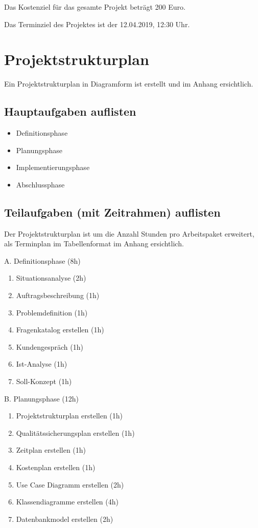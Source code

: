 \documentclass[11pt, a4paper]{article}
\begin{document}
Das Kostenziel für das gesamte Projekt beträgt 200 Euro.

Das Terminziel des Projektes ist der 12.04.2019, 12:30 Uhr.

\section{Projektstrukturplan}
Ein Projektstrukturplan in Diagramform ist erstellt und im Anhang ersichtlich.

\subsection{Hauptaufgaben auflisten}
\begin{itemize}
  \item Definitionsphase
  \item Planungsphase
  \item Implementierungsphase
  \item Abschlussphase
\end{itemize}

\subsection{Teilaufgaben (mit Zeitrahmen) auflisten}
Der Projektstrukturplan ist um die Anzahl Stunden pro Arbeitspaket erweitert,
als Terminplan im Tabellenformat im Anhang ersichtlich.

A. Definitionsphase (8h)
\begin{enumerate}
  \item Situationsanalyse (2h)
  \item Auftragsbeschreibung (1h)
  \item Problemdefinition (1h)
  \item Fragenkatalog erstellen (1h)
  \item Kundengespräch (1h)
  \item Ist-Analyse (1h)
  \item Soll-Konzept (1h)
\end{enumerate}

B. Planungsphase (12h)
\begin{enumerate}
  \item Projektstrukturplan erstellen (1h)
  \item Qualitätssicherungsplan erstellen (1h)
  \item Zeitplan erstellen (1h)
  \item Kostenplan erstellen (1h)
  \item Use Case Diagramm erstellen (2h)
  \item Klassendiagramme erstellen (4h)
  \item Datenbankmodel erstellen (2h)
\end{enumerate}
\end{document}
